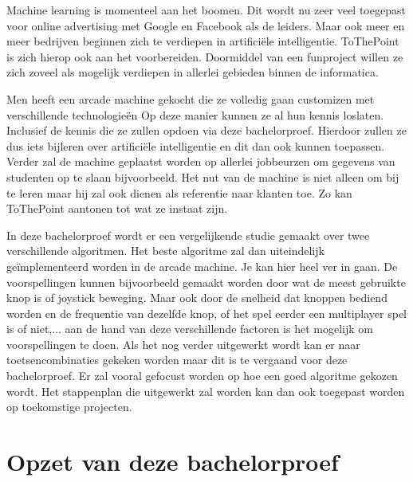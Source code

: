 
Machine learning is momenteel aan het boomen. Dit wordt nu zeer veel toegepast voor online advertising met Google en Facebook als de leiders. Maar ook meer en meer bedrijven beginnen zich te verdiepen in artificiële intelligentie. ToThePoint is zich hierop ook aan het voorbereiden. Doormiddel van een funproject willen ze  zich zoveel als mogelijk verdiepen in allerlei gebieden binnen de informatica. 

Men heeft een arcade machine gekocht die ze volledig gaan customizen met verschillende technologieën Op deze manier kunnen ze al hun kennis loslaten. Inclusief de kennis die ze zullen opdoen via deze bachelorproef. Hierdoor zullen ze dus iets bijleren over artificiële intelligentie en dit dan ook kunnen toepassen. Verder zal de machine geplaatst worden op allerlei jobbeurzen om gegevens van studenten op te slaan bijvoorbeeld. Het nut van de machine is niet alleen om bij te leren maar hij zal ook dienen als referentie naar klanten toe. Zo kan ToThePoint aantonen tot wat ze instaat zijn. 

In deze bachelorproef wordt er een vergelijkende studie gemaakt over twee verschillende algoritmen. Het beste algoritme zal dan uiteindelijk geïmplementeerd worden in de arcade machine. Je kan hier heel ver in gaan. De voorspellingen kunnen bijvoorbeeld gemaakt worden door wat de meest gebruikte knop is of joystick beweging. Maar ook door de snelheid dat knoppen bediend worden en de frequentie van dezelfde knop, of het spel eerder een multiplayer spel is of niet,...  aan de hand van deze verschillende factoren is het mogelijk om voorspellingen te doen. Als het nog verder uitgewerkt wordt kan er naar toetsencombinaties gekeken worden maar dit is te vergaand voor deze bachelorproef. Er zal vooral gefocust worden op hoe een goed algoritme gekozen wordt. Het stappenplan die uitgewerkt zal worden kan dan ook toegepast worden op toekomstige projecten.



\section{Opzet van deze bachelorproef}
\label{sec:opzet-bachelorproef}

